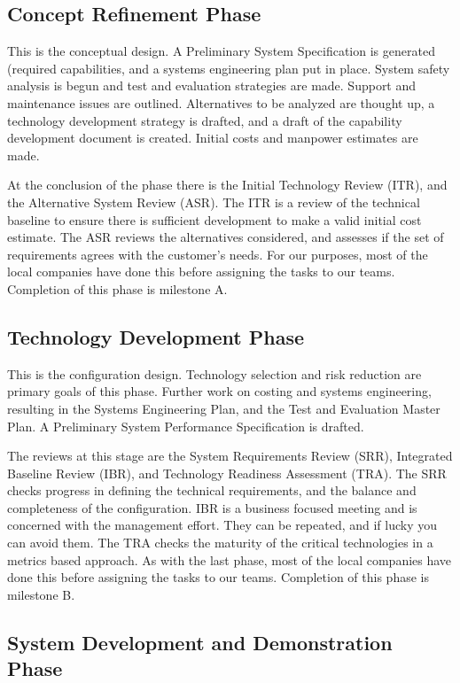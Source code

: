\subsection{Concept Refinement Phase}
This is the conceptual design.  A Preliminary System Specification is generated (required capabilities, and a systems engineering plan put in place.  System safety analysis is begun and test and evaluation strategies are made.  Support and maintenance issues are outlined.  Alternatives to be analyzed are thought up, a technology development strategy is drafted, and a draft of the capability development document is created.  Initial costs and manpower estimates are made.

At the conclusion of the phase there is the Initial Technology Review (ITR), and the Alternative System Review (ASR).  The ITR is a review of the technical baseline to ensure there is sufficient development to make a valid initial cost estimate.  The ASR reviews the alternatives considered, and assesses if the set of requirements agrees with the customer's needs.  For our purposes, most of the local companies have done this before assigning the tasks to our teams.  Completion of this phase is milestone A.

\subsection{Technology Development Phase}
This is the configuration design.  Technology selection and risk reduction are primary goals of this phase.  Further work on costing and systems engineering, resulting in the Systems Engineering Plan, and the Test and Evaluation Master Plan.  A Preliminary System Performance Specification is drafted.

The reviews at this stage are the System Requirements Review (SRR), Integrated Baseline Review (IBR), and Technology Readiness Assessment (TRA).  The SRR checks progress in defining the technical requirements, and the balance and completeness of the configuration.  IBR is a business focused meeting and is concerned with the management effort.  They can be repeated, and if lucky you can avoid them.  The TRA checks the maturity of the critical technologies in a metrics based approach.  As with the last phase, most of the local companies have done this before assigning the tasks to our teams.  Completion of this phase is milestone B.

\subsection{System Development and Demonstration Phase}

